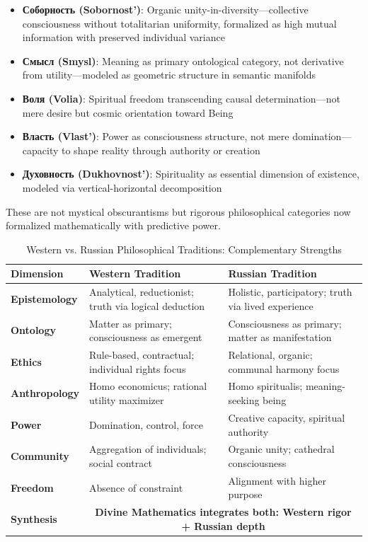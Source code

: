 \documentclass[11pt,a4paper]{article}
\theoremstyle{definition}
\theoremstyle{remark}
\begin{document}
\begin{itemize}[leftmargin=*]
\item \textbf{Соборность (Sobornost')}: Organic unity-in-diversity—collective consciousness without totalitarian uniformity, formalized as high mutual information with preserved individual variance
\item \textbf{Смысл (Smysl)}: Meaning as primary ontological category, not derivative from utility—modeled as geometric structure in semantic manifolds
\item \textbf{Воля (Volia)}: Spiritual freedom transcending causal determination—not mere desire but cosmic orientation toward Being
\item \textbf{Власть (Vlast')}: Power as consciousness structure, not mere domination—capacity to shape reality through authority or creation
\item \textbf{Духовность (Dukhovnost')}: Spirituality as essential dimension of existence, modeled via vertical-horizontal decomposition
\end{itemize}

These are not mystical obscurantisms but rigorous philosophical categories now formalized mathematically with predictive power.

\begin{table}[H]
\centering
\caption{Western vs. Russian Philosophical Traditions: Complementary Strengths}
\label{tab:west_vs_russia}
\begin{tabular}{|p{3cm}|p{5cm}|p{5cm}|}
\hline
\textbf{Dimension} & \textbf{Western Tradition} & \textbf{Russian Tradition} \\
\hline
\textbf{Epistemology} & Analytical, reductionist; truth via logical deduction & Holistic, participatory; truth via lived experience \\
\hline
\textbf{Ontology} & Matter as primary; consciousness as emergent & Consciousness as primary; matter as manifestation \\
\hline
\textbf{Ethics} & Rule-based, contractual; individual rights focus & Relational, organic; communal harmony focus \\
\hline
\textbf{Anthropology} & Homo economicus; rational utility maximizer & Homo spiritualis; meaning-seeking being \\
\hline
\textbf{Power} & Domination, control, force & Creative capacity, spiritual authority \\
\hline
\textbf{Community} & Aggregation of individuals; social contract & Organic unity; cathedral consciousness \\
\hline
\textbf{Freedom} & Absence of constraint & Alignment with higher purpose \\
\hline
\rowcolor{green!10}
\textbf{Synthesis} & \multicolumn{2}{c|}{\textbf{Divine Mathematics integrates both: Western rigor + Russian depth}} \\
\hline
\end{tabular}
\end{table}
\end{document}
